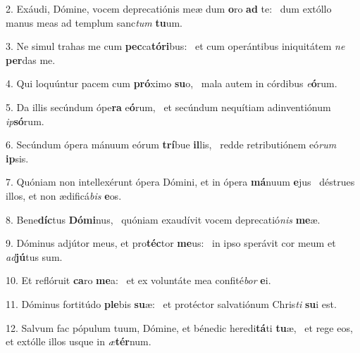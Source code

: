 2. Exáudi, Dómine, vocem deprecatiónis meæ dum \textbf{o}ro \textbf{ad} te: \ast\  dum extóllo manus meas ad templum sanc\textit{tum} \textbf{tu}um.\

3. Ne simul trahas me cum \textbf{pec}ca\textbf{tó}\textbf{ri}bus: \ast\  et cum operántibus iniquitátem \textit{ne} \textbf{per}das me.\

4. Qui loquúntur pacem cum \textbf{pró}ximo \textbf{su}o, \ast\  mala autem in córdibus \textit{e}\textbf{ó}rum.\

5. Da illis secúndum ópe\textbf{ra} e\textbf{ó}rum, \ast\  et secúndum nequítiam adinventiónum \textit{ip}\textbf{só}rum.\

6. Secúndum ópera mánuum eórum \textbf{trí}bue \textbf{il}lis, \ast\  redde retributiónem eó\textit{rum} \textbf{ip}sis.\

7. Quóniam non intellexérunt ópera Dómini, et in ópera \textbf{má}nuum \textbf{e}jus \ast\  déstrues illos, et non ædificá\textit{bis} \textbf{e}os.\

8. Bene\textbf{díc}tus \textbf{Dó}\textbf{mi}nus, \ast\  quóniam exaudívit vocem deprecatió\textit{nis} \textbf{me}æ.\

9. Dóminus adjútor meus, et pro\textbf{téc}tor \textbf{me}us: \ast\  in ipso sperávit cor meum et \textit{ad}\textbf{jú}tus sum.\

10. Et reflóruit \textbf{ca}ro \textbf{me}a: \ast\  et ex voluntáte mea confité\textit{bor} \textbf{e}i.\

11. Dóminus fortitúdo \textbf{ple}bis \textbf{su}æ: \ast\  et protéctor salvatiónum Chris\textit{ti} \textbf{su}i est.\

12. Salvum fac pópulum tuum, Dómine, et bénedic heredi\textbf{tá}ti \textbf{tu}æ, \ast\  et rege eos, et extólle illos usque in \textit{æ}\textbf{tér}num.\

